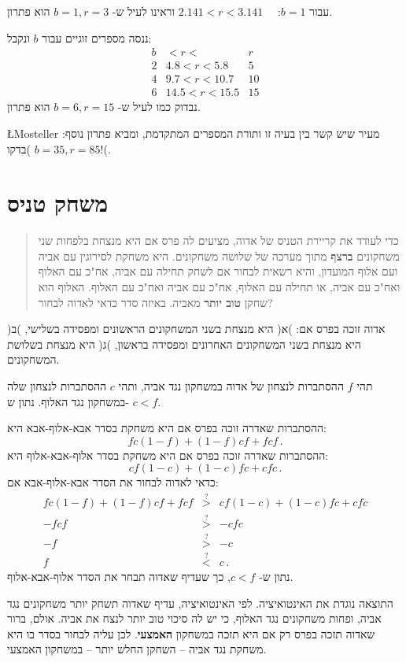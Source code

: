 \documentclass[11pt,a4paper]{article}
\begin{document}
עבור 
$b=1$:$\quad$
$2.141 < r< 3.141$ 
וראינו לעיל ש-%
$b=1,r=3$
הוא פתרון.

\bigskip

ננסה מספרים זוגיים עבור
$b$
ונקבל:
\begin{displaymath}
\renewcommand{\arraystretch}{1}
\begin{array}{r|c|c}
b& <r< &r\\
\hline
2&4.8<r<5.8&5\\
4&9.7<r<10.7&10\\
6&14.5<r<15.5&15
\end{array}
\end{displaymath}
נבדוק כמו לעיל ש-%
$b=6,r=15$
הוא פתרון.

\L{Mosteller}
מעיר שיש קשר בין בעיה זו ותורת המספרים המתקדמת, ומביא פתרון נוסף:
$b=35,r=85$
)בדקו!(.

\newpage

\section{משחק טניס}

\begin{quote}
כדי לעודד את קריירת הטניס של אדוה, מציעים לה פרס אם היא מנצחת בלפחות שני משחקונים 
\textbf{ברצף}
מתוך מערכה של שלושה משחקונים. היא משחקת לסירוגין עם אביה ועם אלוף המועדון, והיא רשאית לבחור אם לשחק תחילה עם אביה, אח"כ עם האלוף ואח"כ עם אביה, או תחילה עם האלוף, אח"כ עם אביה ואח"כ עם האלוף. האלוף הוא שחקן
\textbf{טוב יותר}
מאביה. באיזה סדר כדאי לאדוה לבחור?
\end{quote}

אדוה זוכה בפרס אם: )א( היא מנצחת בשני המשחקונים הראשונים ומפסידה בשלישי, )ב( היא מנצחת בשני המשחקונים האחרונים ומפסידה בראשון, )ג( היא מנצחת בשלושת המשחקונים.

תהי 
$f$
ההסתברות לנצחון של אדוה במשחקון נגד אביה, ותהי 
$c$
ההסתברות לנצחון שלה במשחקון נגד האלוף. נתון ש-%
$c<f$.

ההסתברות שאדרה זוכה בפרס אם היא משחקת בסדר אבא-אלוף-אבא היא:
\[
fc(1-f) + (1-f)cf + fcf\,.
\]
ההסתברות שאדרה זוכה בפרס אם היא משחקת בסדר אלוף-אבא-אלוף היא:
\[
cf(1-c)+(1-c)fc+cfc\,.
\]
כדאי לאדוה לבחור את הסדר אבא-אלוף-אבא אם:
\begin{eqnarray*}
fc(1-f) + (1-f)cf + fcf & \stackrel{?}{>}& cf(1-c)+(1-c)fc+cfc\\
-fcf & \stackrel{?}{>}& -cfc\\
-f & \stackrel{?}{>}& -c\\
f & \stackrel{?}{<}& c\,.
\end{eqnarray*}
נתון ש-%
$c<f$,
כך שעדיף שאדוה תבחר את הסדר אלוף-אבא-אלוף.

התוצאה נוגדת את האינטואיציה. לפי האינטואיציה, עדיף שאדוה תשחק יותר משחקונים נגד אביה, ופחות משחקונים נגד האלוף, כי יש לה סיכוי טוב יותר לנצח את אביה. אולם, ברור שאדוה תזכה בפרס רק אם היא תזכה במשחקון
\textbf{האמצעי}.
לכן עליה לבחור בסדר בו היא משחקת נגד אביה -- השחקן החלש יותר -- במשחקון האמצעי.
\end{document}
